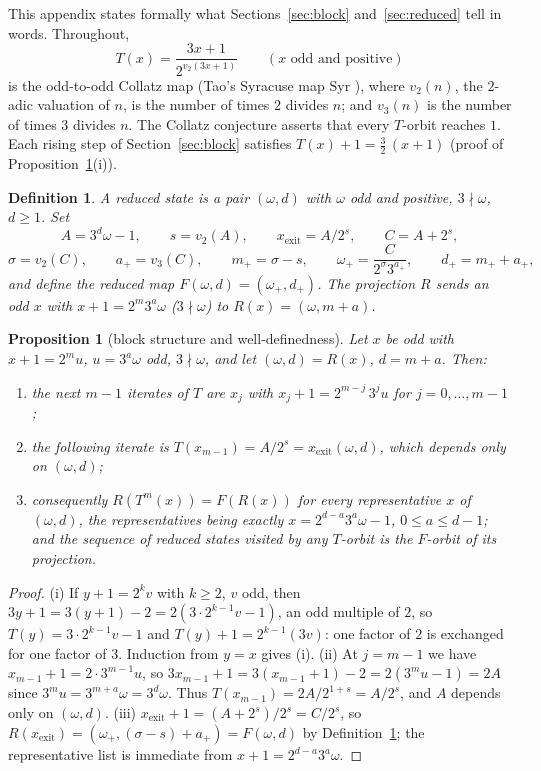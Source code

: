 \documentclass[11pt]{article}
\newtheorem{proposition}[theorem]{Proposition}
\newtheorem{definition}[theorem]{Definition}
\theoremstyle{remark}
\newcommand{\vt}[1]{v_2\!\left(#1\right)}
\newcommand{\vth}[1]{v_3\!\left(#1\right)}
\newcommand{\w}{\omega}
\newcommand{\wnext}{\w_{+}}
\newcommand{\dnext}{d_{+}}
\begin{document}
This appendix states formally what Sections~\ref{sec:block} and~\ref{sec:reduced} tell in words. Throughout,
\[ T(x) = \frac{3x+1}{2^{\vt{3x+1}}} \qquad (x \text{ odd and positive}) \]
is the odd-to-odd Collatz map (Tao's Syracuse map $\mathrm{Syr}$ \cite{tao}), where $\vt{n}$, the $2$-adic valuation of $n$, is the number of times $2$ divides $n$; and $\vth{n}$ is the number of times $3$ divides $n$. The Collatz conjecture asserts that every $T$-orbit reaches $1$. Each rising step of Section~\ref{sec:block} satisfies $T(x) + 1 = \tfrac32\,(x+1)$ (proof of Proposition~\ref{prop:block}(i)).

\begin{definition}\label{def:reduced}
A \emph{reduced state} is a pair $(\w, d)$ with $\w$ odd and positive, $3\nmid\w$, $d \ge 1$. Set
\[ A = 3^d\w - 1,\qquad s = \vt{A},\qquad x_{\mathrm{exit}} = A/2^s,\qquad C = A + 2^s, \]
\[ \sigma = \vt{C},\qquad a_+ = \vth{C},\qquad m_+ = \sigma - s,\qquad \wnext = \frac{C}{2^{\sigma}3^{a_+}},\qquad \dnext = m_+ + a_+, \]
and define the \emph{reduced map} $F(\w,d) = (\wnext, \dnext)$. The \emph{projection} $R$ sends an odd $x$ with $x + 1 = 2^m 3^a \w$ ($3\nmid\w$) to $R(x) = (\w, m + a)$.
\end{definition}

\begin{proposition}[block structure and well-definedness]\label{prop:block}
Let $x$ be odd with $x + 1 = 2^m u$, $u = 3^a\w$ odd, $3 \nmid \w$, and let $(\w,d) = R(x)$, $d = m+a$. Then:
\begin{enumerate}
\item[(i)] the next $m - 1$ iterates of $T$ are $x_j$ with $x_j + 1 = 2^{m-j}\,3^j u$ for $j = 0,\dots,m-1$;
\item[(ii)] the following iterate is $T(x_{m-1}) = A/2^s = x_{\mathrm{exit}}(\w,d)$, which depends only on $(\w,d)$;
\item[(iii)] consequently $R(T^{m}(x)) = F(R(x))$ for every representative $x$ of $(\w,d)$, the representatives being exactly $x = 2^{d-a}3^a\w - 1$, $0 \le a \le d-1$; and the sequence of reduced states visited by any $T$-orbit is the $F$-orbit of its projection.
\end{enumerate}
\end{proposition}

\begin{proof}
(i) If $y + 1 = 2^k v$ with $k \ge 2$, $v$ odd, then $3y + 1 = 3(y+1) - 2 = 2\left(3\cdot 2^{k-1}v - 1\right)$, an odd multiple of $2$, so $T(y) = 3\cdot2^{k-1}v - 1$ and $T(y) + 1 = 2^{k-1}(3v)$: one factor of $2$ is exchanged for one factor of $3$. Induction from $y = x$ gives (i). (ii) At $j = m-1$ we have $x_{m-1} + 1 = 2\cdot 3^{m-1}u$, so $3x_{m-1} + 1 = 3(x_{m-1}+1) - 2 = 2(3^m u - 1) = 2A$ since $3^m u = 3^{m+a}\w = 3^d \w$. Thus $T(x_{m-1}) = 2A/2^{1+s} = A/2^s$, and $A$ depends only on $(\w,d)$. (iii) $x_{\mathrm{exit}} + 1 = (A + 2^s)/2^s = C/2^s$, so $R(x_{\mathrm{exit}}) = (\wnext, (\sigma - s) + a_+) = F(\w,d)$ by Definition~\ref{def:reduced}; the representative list is immediate from $x + 1 = 2^{d-a}3^a\w$.
\end{proof}
\end{document}
